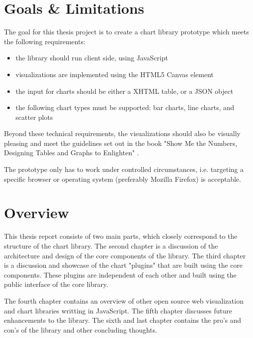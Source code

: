 \section{Goals \& Limitations}
The goal for this thesis project is to create a chart library prototype which meets the following requirements:
\begin{itemize}
\item the library should run client side, using JavaScript
\item visualizations are implemented using the HTML5 Canvas element
\item the input for charts should be either a XHTML table, or a JSON object
\item the following chart types must be supported: bar charts, line charts, and scatter plots
\end{itemize}
Beyond these technical requirements, the visualizations should also be visually pleasing and meet the guidelines set out in the book "Show Me the Numbers, Designing Tables and Graphs to Enlighten" \cite{few06}.

The prototype only has to work under controlled circumstances, i.e. targeting a specific browser or operating system (preferably Mozilla Firefox) is acceptable.

\section{Overview}
This thesis report consists of two main parts, which closely correspond to the structure of the chart library. The second chapter is a discussion of the architecture and design of the core components of the library. The third chapter is a discussion and showcase of the chart "plugins" that are built using the core components. These plugins are independent of each other and built using the public interface of the core library.

The fourth chapter contains an overview of other open source web visualization and chart libraries writting in JavaScript. The fifth chapter discusses future enhancements to the library. The sixth and last chapter contains the pro's and con's of the library and other concluding thoughts.


